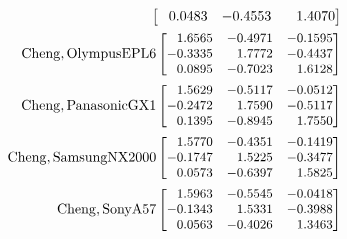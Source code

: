\begin{align}
\begin{bmatrix}
\phantom{-}0.0483 & -0.4553 & \phantom{-}1.4070 \\
\end{bmatrix} \nonumber
 \\
\small{\mathrm{Cheng, OlympusEPL6}}
\begin{bmatrix}
\phantom{-}1.6565 & -0.4971 & -0.1595 \\
-0.3335 & \phantom{-}1.7772 & -0.4437 \\
\phantom{-}0.0895 & -0.7023 & \phantom{-}1.6128 \\
\end{bmatrix} \nonumber
 \\
\small{\mathrm{Cheng, PanasonicGX1}}
\begin{bmatrix}
\phantom{-}1.5629 & -0.5117 & -0.0512 \\
-0.2472 & \phantom{-}1.7590 & -0.5117 \\
\phantom{-}0.1395 & -0.8945 & \phantom{-}1.7550 \\
\end{bmatrix} \nonumber
 \\
\small{\mathrm{Cheng, SamsungNX2000}}
\begin{bmatrix}
\phantom{-}1.5770 & -0.4351 & -0.1419 \\
-0.1747 & \phantom{-}1.5225 & -0.3477 \\
\phantom{-}0.0573 & -0.6397 & \phantom{-}1.5825 \\
\end{bmatrix} \nonumber
 \\
\small{\mathrm{Cheng, SonyA57}}
\begin{bmatrix}
\phantom{-}1.5963 & -0.5545 & -0.0418 \\
-0.1343 & \phantom{-}1.5331 & -0.3988 \\
\phantom{-}0.0563 & -0.4026 & \phantom{-}1.3463 \\
\end{bmatrix} \nonumber
\end{align}
